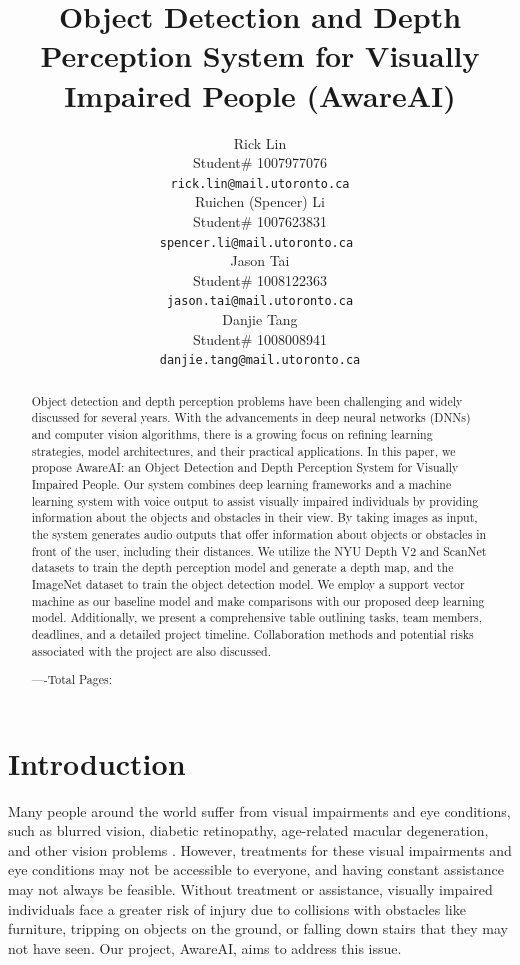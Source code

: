 \documentclass{article} %
\title{Object Detection and Depth Perception System for Visually Impaired People (AwareAI)
}
\author{Rick Lin  \\
Student\# 1007977076\\
\texttt{rick.lin@mail.utoronto.ca} \\
\And
Ruichen (Spencer) Li  \\
Student\# 1007623831 \\
\texttt{spencer.li@mail.utoronto.ca  } \\
\AND
Jason Tai  \\
Student\# 1008122363 \\
\texttt{jason.tai@mail.utoronto.ca} \\
\And 
\hspace{1.61cm} Danjie Tang \\
\hspace{1.61cm} Student\# 1008008941 \\
\hspace{1.61cm} \texttt{danjie.tang@mail.utoronto.ca}
}
\begin{document}
\maketitle

\begin{abstract}
Object detection and depth perception problems have been challenging and widely discussed for several years. With the advancements in deep neural networks (DNNs) and computer vision algorithms, there is a growing focus on refining learning strategies, model architectures, and their practical applications. In this paper, we propose AwareAI: an Object Detection and Depth Perception System for Visually Impaired People. Our system combines deep learning frameworks and a machine learning system with voice output to assist visually impaired individuals by providing information about the objects and obstacles in their view. By taking images as input, the system generates audio outputs that offer information about objects or obstacles in front of the user, including their distances. We utilize the NYU Depth V2 and ScanNet datasets to train the depth perception model and generate a depth map, and the ImageNet dataset to train the object detection model. We employ a support vector machine as our baseline model and make comparisons with our proposed deep learning model. Additionally, we present a comprehensive table outlining tasks, team members, deadlines, and a detailed project timeline. Collaboration methods and potential risks associated with the project are also discussed.

----Total Pages: \pageref{last_page}
\end{abstract}






\section{Introduction}
Many people around the world suffer from visual impairments and eye conditions, such as blurred vision, diabetic retinopathy, age-related macular degeneration, and other vision problems \cite{Types_of_Vision_Problems} . However, treatments for these visual impairments and eye conditions may not be accessible to everyone, and having constant assistance may not always be feasible. Without treatment or assistance, visually impaired individuals face a greater risk of injury due to collisions with obstacles like furniture, tripping on objects on the ground, or falling down stairs that they may not have seen. Our project, AwareAI, aims to address this issue.
\end{document}
